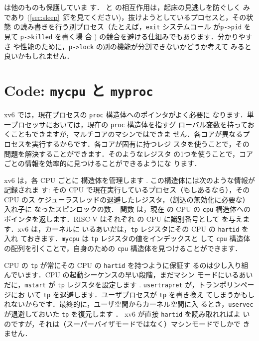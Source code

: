  は他のものも保護していま
す． と  の相互作用は，起床の見逃しを防ぐしく
みであり (\ref{sec:sleep}~節を見てください)，抜けようとしているプロセスと，その状態
の読み書きを行う別プロセス（たとえば，\lstinline{exit} システムコール
が\lstinline{p->pid} を見て \lstinline{p->killed} を書く場
合 ) の競合を避ける仕組みでもあります．分かりやすさ
や性能のために，\lstinline{p->lock} の別の機能が分割できないかどうか考えて
みると良いかもしれません．

\section{Code: \texttt{mycpu} と \texttt{myproc}}

xv6 では，現在プロセスの \lstinline{proc} 構造体へのポインタがよく必要に
なります．単一プロセッサにおいては，現在の \lstinline{proc} 構造体を指すグ
ローバル変数を持っておくこともできますが，マルチコアのマシンではできま
せん．各コアが異なるプロセスを実行するからです．各コアが固有に持つレジ
スタを使うことで，その問題を解決することができます．そのようなレジスタ
の1つを使うことで，コアごとの情報を効率的に見つけることができるようにな
ります．

xv6 は，各 CPU ごとに  構造体を管理します
. 
この構造体には次のような情報が記録されま
す: その CPU で現在実行しているプロセス（もしあるなら），その CPU のス
ケジューラスレッドの退避したレジスタ，（割込の無効化に必要な）入れ子に
なったスピンロックの数． 関数  は，現在
の CPU の \lstinline{cpu} 構造体へのポインタを返します．RISC-V はそれぞれ
の CPU に識別番号として  を与えます．xv6 は，カーネルに
いるあいだは，\lstinline{tp} レジスタにその CPU の \lstinline{hartid} を入れ
ておきます．\lstinline{mycpu} は \lstinline{tp} レジスタの値をインデックスと
して \lstinline{cpu} 構造体の配列を引くことで，自身のための \lstinline{cpu}
構造体を見つけることができます．

CPU の \lstinline{tp} が常にその CPU の \lstinline{hartid} を持つように保証す
るのは少し入り組んでいます．CPU の起動シーケンスの早い段階，まだマシン
モードにいるあいだに，\lstinline{mstart} が \lstinline{tp} レジスタを設定します
. 
\lstinline{usertrapret} が，トランポリンページにお
いて \lstinline{tp} を退避します．ユーザプロセスが \lstinline{tp} を書き換え
てしまうかもしれないからです．最終的に，ユーザ空間からカーネル空間に入
るとき，\lstinline{uservec} が退避しておいた \lstinline{tp} を復元します
．
xv6 が直接 \lstinline{hartid} を読み取れればよ
いのですが，それは（スーパーバイザモードではなく）マシンモードでしかで
きません．

